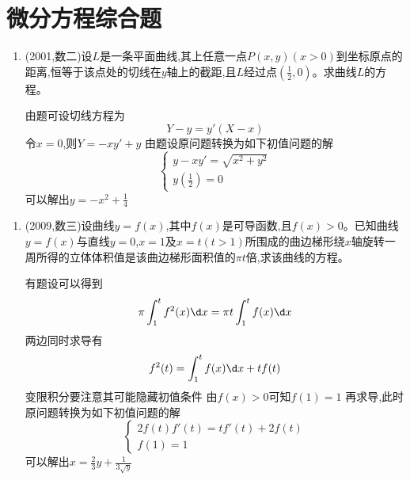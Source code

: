 \documentclass[12pt, a4paper, oneside, UTF8]{ctexbook}
\begin{document}
\section{ 微分方程综合题}
\begin{enumerate}[label=\arabic*.,start=18]
    \item (2001,数二)设$L$是一条平面曲线,其上任意一点$P(x,y)(x>0)$到坐标原点的距离,恒等于该点处的切线在$y$轴上的截距,且$L$经过点$(\frac{1}{2},0)$。求曲线$L$的方程。
    
    \begin{solution}
    由题可设切线方程为
    $$
    Y-y=y'(X-x)
    $$
    令$x=0$,则$Y=-xy'+y$ 由题设原问题转换为如下初值问题的解
    $$
        \begin{cases}
        y-xy'=\sqrt{x^2+y^2} \\
        y(\frac{1}{2})=0
        \end{cases}
    $$
    可以解出$\displaystyle y=-x^2+\frac{1}{4}$
    \end{solution}
\end{enumerate}

\begin{enumerate}[label=\arabic*.,start=19]
    \item (2009,数三)设曲线$y=f(x)$,其中$f(x)$是可导函数,且$f(x)>0$。已知曲线$y=f(x)$与直线$y=0$,$x=1$及$x=t(t>1)$所围成的曲边梯形绕$x$轴旋转一周所得的立体体积值是该曲边梯形面积值的$\pi t$倍,求该曲线的方程。
    
    \begin{solution}
    有题设可以得到
    $$
    \pi\int_{1}^{t}f^{2}(x)\d x = \pi t\int_{1}^{t}f(x)\d x
    $$
    两边同时求导有
    $$
    f^{2}(t)=\int_{1}^{t}f(x)\d x+tf(t)
    $$
    {\color{red} 变限积分要注意其可能隐藏初值条件} 由$f(x)>0$可知$f(1)=1$ 再求导,此时原问题转换为如下初值问题的解
    $$
        \begin{cases}
            2f(t)f'(t)=tf'(t)+2f(t) \\
            f(1) = 1
        \end{cases}
    $$
    可以解出$\displaystyle x=\frac{2}{3}y+\frac{1}{3\sqrt{y}}$
    \end{solution}
\end{enumerate}
\end{document}
